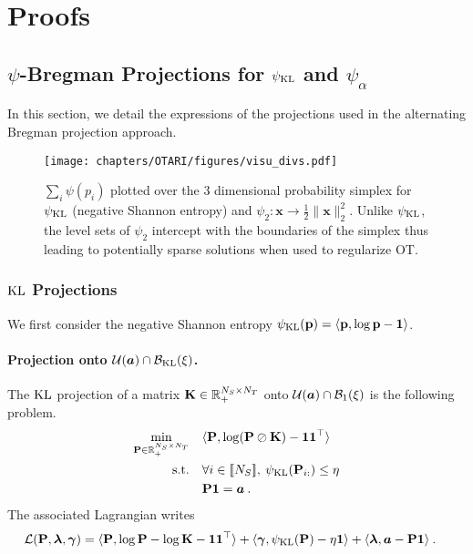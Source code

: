 

\section{Proofs}

\subsection{$\psi$-Bregman Projections for $\psi_{\operatorname{KL}}$ and $\psi_{\alpha}$}\label{sec:proof_projs}

    In this section, we detail the expressions of the projections used in the alternating Bregman projection approach.

    \begin{figure*}[t]
        \begin{center}
        \centerline{\texttt{[image: chapters/OTARI/figures/visu\_divs.pdf]}}
        \caption{$\sum_i \psi(p_i)$ plotted over the 3 dimensional probability simplex for $\psi_{\operatorname{KL}}$ (negative Shannon entropy) and $\psi_2 : \bm{x} \to \frac{1}{2} \| \bm{x} \|^2_2$. Unlike $\psi_{\operatorname{KL}}$, the level sets of $\psi_2$ intercept with the boundaries of the simplex thus leading to potentially sparse solutions when used to regularize OT.}
        \label{fig:Ps_vs_Pse}
        \end{center}
    \end{figure*}
    
    \subsubsection{$\operatorname{KL}$ Projections}

    We first consider the negative Shannon entropy $\psi_{\operatorname{KL}}({\mathbf{p}}) = \langle {\mathbf{p}} , \log {\mathbf{p}} - \bm{1} \rangle$.

    \paragraph{Projection onto ${\mathcal{U}}(\bm{a}) \cap \mathcal{B}_{\operatorname{KL}}(\xi)$.}
    The $\operatorname{KL}$ projection of a matrix ${\mathbf{K}} \in \mathbb{R}_+^{N_S \times N_T}$ onto ${\mathcal{U}}(\bm{a}) \cap \mathcal{B}_1(\xi)$ is the following problem.
    \begin{align}
        \min_{{\mathbf{P}} \in \mathbb{R}_+^{N_S \times N_T}} \quad &\langle {\mathbf{P}}, \log ({\mathbf{P}} \oslash {\mathbf{K}}) - \bm{1}\bm{1}^\top \rangle \\
        \text{s.t.} \quad &\forall i \in {[\![N_S]\!]}, \: \psi_{\operatorname{KL}}({\mathbf{P}}_{i:}) \leq \eta \\
        & {\mathbf{P}} \bm{1} = \bm{a} \:.
    \end{align}
    The associated Lagrangian writes
    \begin{align}
        \mathcal{L}({\mathbf{P}}, \bm{\lambda}, \bm{\gamma}) &= \langle {\mathbf{P}}, \log {\mathbf{P}} - \log {\mathbf{K}} - \bm{1}\bm{1}^\top \rangle + \langle \bm{\gamma}, \psi_{\operatorname{KL}}({\mathbf{P}}) - \eta \bm{1}\rangle + \langle \bm{\lambda}, \bm{a} - {\mathbf{P}} \bm{1} \rangle \:.
    \end{align}
    
